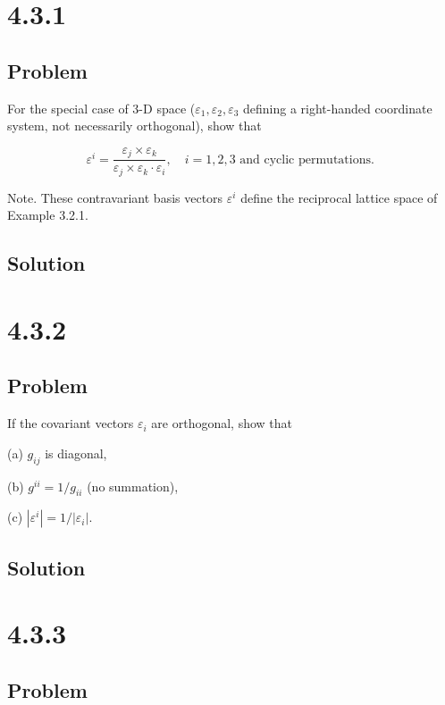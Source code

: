 \documentclass[12pt]{article}
\begin{document}
\newpage
\section{4.3.1}

\subsection{Problem}

For the special case of 3-D space (\(\varepsilon_1, \varepsilon_2, \varepsilon_3\) defining a right-handed coordinate system,
not necessarily orthogonal), show that

\[
    \varepsilon^i = \frac{\varepsilon_j \times \varepsilon_k}{\varepsilon_j \times \varepsilon_k \cdot \varepsilon_i}, \quad i = 1, 2, 3 \text{ and cyclic permutations. }
\]

Note. These contravariant basis vectors \(\varepsilon^i\) define the reciprocal lattice space of
Example 3.2.1.

\subsection{Solution}

\newpage
\section{4.3.2}

\subsection{Problem}

If the covariant vectors \(\varepsilon_i\) are orthogonal, show that

(a) \(g_{ij}\) is diagonal,

(b) \(g^{ii} = 1/g_{ii}\) (no summation),

(c) \(|\varepsilon^i| = 1/|\varepsilon_i|\).

\subsection{Solution}

\newpage
\section{4.3.3}

\subsection{Problem}
\end{document}
